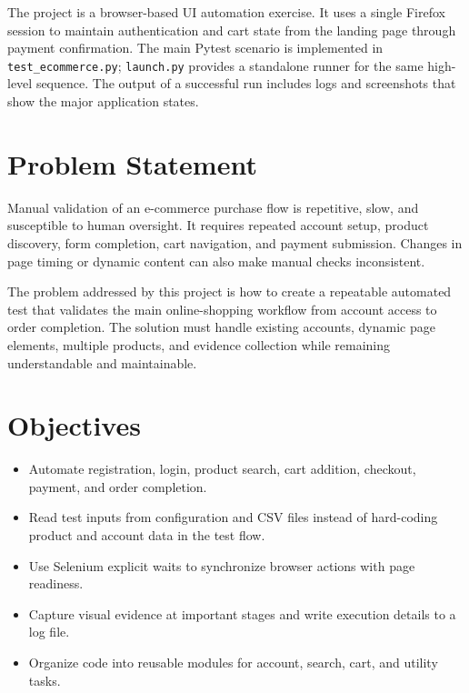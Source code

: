 \documentclass[12pt,a4paper]{article}
\begin{document}
The project is a browser-based UI automation exercise. It uses a single Firefox session to maintain authentication and cart state from the landing page through payment confirmation. The main Pytest scenario is implemented in \texttt{test\_ecommerce.py}; \texttt{launch.py} provides a standalone runner for the same high-level sequence. The output of a successful run includes logs and screenshots that show the major application states.

\section{Problem Statement}
Manual validation of an e-commerce purchase flow is repetitive, slow, and susceptible to human oversight. It requires repeated account setup, product discovery, form completion, cart navigation, and payment submission. Changes in page timing or dynamic content can also make manual checks inconsistent.

The problem addressed by this project is how to create a repeatable automated test that validates the main online-shopping workflow from account access to order completion. The solution must handle existing accounts, dynamic page elements, multiple products, and evidence collection while remaining understandable and maintainable.

\section{Objectives}
\begin{itemize}[leftmargin=1.6em]
  \item Automate registration, login, product search, cart addition, checkout, payment, and order completion.
  \item Read test inputs from configuration and CSV files instead of hard-coding product and account data in the test flow.
  \item Use Selenium explicit waits to synchronize browser actions with page readiness.
  \item Capture visual evidence at important stages and write execution details to a log file.
  \item Organize code into reusable modules for account, search, cart, and utility tasks.
\end{itemize}

\end{document}
